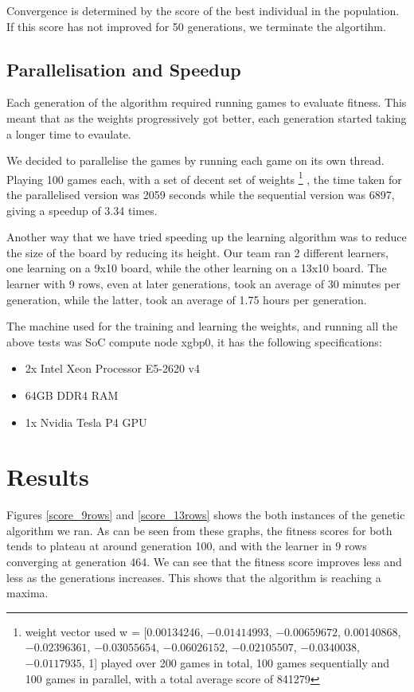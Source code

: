 \documentclass[a4paper,12pt,twocolumn]{article}
\begin{document}
Convergence is determined by the score of the best individual in the population.
If this score has not improved for 50 generations, we terminate the algortihm.

\subsection{Parallelisation and Speedup}
\label{parallelisation_n_speedup}
Each generation of the algorithm required running games to evaluate fitness. This
meant that as the weights progressively got better, each generation started
taking a longer time to evaulate.

We decided to parallelise the games by running each game on its own thread. Playing
100 games each, with a set of decent set of weights
\footnote{
    weight vector used w = [0.00134246, $-0.01414993$, $-0.00659672$, 0.00140868, $-0.02396361$, $-0.03055654$, $-0.06026152$, $-0.02105507$, $-0.0340038$, $-0.0117935$, 1]
    played over 200 games in total, 100 games sequentially and 100 games in parallel, with a total average score of 841279
}
, the time taken for the parallelised version was 2059 seconds while the
sequential version was 6897, giving a speedup of 3.34 times.

Another way that we have tried speeding up the learning algorithm was to reduce
the size of the board by reducing its height. Our team ran 2 different learners,
one learning on a 9x10 board, while the other learning on a 13x10 board.
The learner with 9 rows, even at later generations, took an average of 30 minutes
per generation, while the latter, took an average of 1.75 hours per generation.

The machine used for the training and learning the weights, and running all the
above tests was SoC compute node xgbp0, it has the following specifications:

\begin{itemize}
    \itemsep0em
    \item 2x Intel Xeon Processor E5-2620 v4
    \item 64GB DDR4 RAM
    \item 1x Nvidia Tesla P4 GPU
\end{itemize}

\section{Results}
\label{results}

Figures \ref{score_9rows} and \ref{score_13rows} shows the both instances of the
genetic algorithm we ran. As can be seen from these graphs, the fitness scores
for both tends to plateau at around generation 100, and with the learner in 9
rows converging at generation 464. We can see that the fitness score improves
less and less as the generations increases. This shows that the algorithm is
reaching a maxima.
\end{document}
